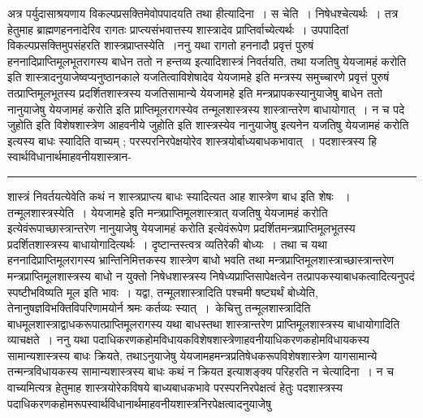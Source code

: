\documentclass[11pt, openany]{book}
\begin{document}
 अत्र पर्युदासाश्रयणाय विकल्पप्रसक्तिमेवोपपादयति {\br तथा हीत्यादिना~। स चेति~}। निषेधश्चेत्यर्थः~। तत्र हेतुमाह 
ब्राह्मणहननादेरिव रागतः प्राप्त्यसंभवात्तस्य शास्त्रादेव प्राप्तिर्वाच्येत्यर्थः~। उपपादितां विकल्पप्रसक्तिमुपसंहरति {\br शास्त्रप्राप्तस्येति~।ननु} यथा रागतो हननादौ प्रवृत्तं पुरुषं हननादिप्राप्तिमूलभूतरागस्य बाधेन ततो न हन्तव्य इत्यादिशास्त्रं निवर्तयति, तथा {\qt यजतिषु येयजामहं करोति}  इति शास्त्रादनुयाजेष्वप्यनुष्ठानकाले यजतित्वाविशेषादेव {\qt येयजामहे} इति मन्त्रस्य समुच्चारणे प्रवृत्तं पुरुषं तत्प्राप्तिमूलभूतस्य प्रदर्शितशास्त्रस्य यजतिसामान्ये {\qt येयजामहे} इति मन्त्रप्रापकस्यानुयाजेषु बाधेन ततो {\qt नानुयाजेषु येयजामहं करोति} इति 
\newpage
\lfoot{}
\fancyhead[RE]{[ वि० पर्युदासाश्रयणम् ]}
{\bl\noindent
प्राप्तिमूलरागस्येव तन्मूलशास्त्रस्य शास्त्रान्तरेण बाधायोगात्~। न  च {\qtl पदे जुहोति} इति विशेषशास्त्रेण {\qtl आहवनीये जुहोति} इति शास्त्रस्येव {\qtl नानुयाजेषु}  इत्यनेन {\qtl यजतिषु येयजामहं करोति} इत्यस्य  बाधः स्यादिति वाच्यम् ; परस्परनिरपेक्षयोरेव शास्त्रयोर्बाध्यबाधकभावात्~। पदशास्त्रस्य हि स्वार्थविधानार्थमाहवनीयशास्त्रान-\\}
\hrule
\vspace{3mm}
\noindent
शास्त्रं निवर्तयत्येवेति कथं न शास्त्रप्राप्त्य बाधः स्यादित्यत आह  शास्त्रेण बाध इति \footnotemark शेषः ~। {\br तन्मूलशास्त्रस्येति~।} {\qt येयजामहे} इति मन्त्रप्राप्तिमूलशास्त्रात् {\qt यजतिषु येयजामहं करोति}  इत्येवंरूपाच्छास्त्रान्तरेण  {\qt नानुयाजेषु येयजामहं करोति}  इत्येवंरूपेण
प्रदर्शितमन्त्रप्राप्तिमूलभूतस्य प्रदर्शितशास्त्रस्य बाधायोगादित्यर्थः~। दृष्टान्तस्त्वत्र व्यतिरेकी बोध्यः~। तथा च यथा हननादिप्राप्तिमूलरागस्य भ्रान्तिनिमित्तकस्य शास्त्रेण बाधो भवति तथा मन्त्रप्राप्तिमूलशास्त्राच्छास्त्रान्तरेण मन्त्रप्राप्तिमूलशास्त्रस्य बाधो न युक्तो निषेधशास्त्रस्य निषेध्यप्राप्तिसापेक्षत्वेन तत्प्रापकस्याबाधकत्वादित्यनुपदं स्पष्टीभविष्यति मूल इति भावः~। यद्वा, {\qt तन्मूलशास्त्रादिति पश्चमी षष्ट्यर्थं बोध्येति, तेनानुषज्ञविभक्तिविपरिणामयोर्न श्रमः कर्तव्यः स्यात्~}।~केचित्तु {\qt तन्मूलशास्त्रादिति बाधमूलशास्त्राद्वाधकरूपात्प्राप्तिमूलरागस्य यथा बाधस्तथा शास्त्रान्तरेण प्राप्तिमूलशास्त्रस्य बाधायोगादिति व्याचक्षते~}। {\br ननु} यथा  पदाधिकरणकहोमविधायकविशेषशास्त्रेणाहवनीयाधिकरणकहोमविधायकस्य सामान्यशास्त्रस्य बाधः क्रियते, तथाऽनुयाजेषु येयजामहमन्त्रप्रतिषेधकरूपविशेषशास्त्रेण
यागसामान्ये तन्मन्त्रविधायकस्य सामान्यशास्त्रस्य बाधः कथं न क्रियत इत्याशङ्क्य परिहरति {\br न चेत्यादिना~।} न च वाच्यमित्यत्र हेतुमाह शास्त्रयोरेकविषये बाध्यबाधकभावे परस्परनिरपेक्षत्वं हेतुः पदशास्त्रस्य पदाधिकरणकहोमरूपस्वार्थविधानार्थमाहवनीयशास्त्रनिरपेक्षत्वादनुयाजेषु
\end{document}
